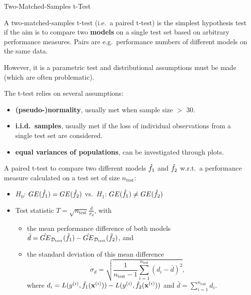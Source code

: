     \begin{frame}[c,allowframebreaks]{Two-Matched-Samples t-Test}

    A two-matched-samples t-test (i.e.\ a paired t-test) is the simplest
    hypothesis test if the aim is to compare two \textbf{models} on a single
    test set based on arbitrary performance measures. Pairs are e.g.\
    performance numbers of different models on the same data.

    However, it is a parametric test and distributional assumptions must be made (which are often problematic).

    The t-test relies on several assumptions:

    \begin{itemize}
    \item \textbf{(pseudo-)normality}, usually met when sample size $>$ 30.
    \item \textbf{i.i.d.\ samples}, usually met if the loss of individual observations from a single test set are considered. %
    \item \textbf{equal variances of populations}, can be investigated through plots.
    \end{itemize}

    \framebreak

    A paired t-test to compare two different models $\hat{f}_1$ and $\hat{f}_2$ w.r.t.\ a performance measure calculated on a test set of size $n_{\text{test}}$:

    \begin{itemize}
    \item $H_0$: $GE(\hat{f}_{1}) = GE(\hat{f}_{2})$ vs.\ $H_1$: $GE(\hat{f}_{1}) \neq GE(\hat{f}_{2})$
    \item Test statistic $T = \sqrt{n_{\text{test}}} \frac{\bar{d}}{\sigma_{d}}$, with
    \begin{itemize}
    \item the mean performance difference of both models
        $\bar{d} = \hat{GE}_{\mathcal{D}_{\text{test}}}(\hat{f}_{1}) - \hat{GE}_{\mathcal{D}_{\text{test}}}(\hat{f}_{2})$, and
    \item the standard deviation of this mean difference
    $$\sigma_{d} = \sqrt{\frac{1}{n_{\text{test}} - 1}\sum_{i=1}^{n_{\text{test}}} \left(d_i - \bar{d} \right)^2},$$
    where $d_i = L(y^{(i)}, \hat{f}_1 (\mathbf{x}^{(i)})) - L(y^{(i)}, \hat{f}_2 (\mathbf{x}^{(i)}))$ and $\bar{d} = \sum\limits_{i=1}^{n_{\text{test}}} d_i$.
    \end{itemize}
    \end{itemize}


\end{frame}

